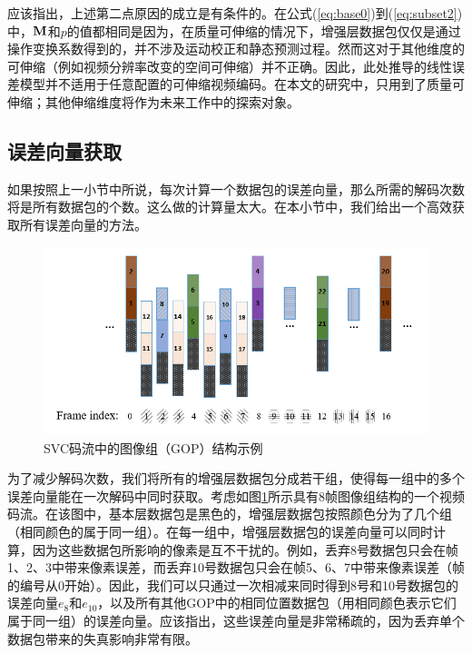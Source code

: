 应该指出，上述第二点原因的成立是有条件的。在公式(\ref{eq:base0})到(\ref{eq:subset2})中，${\rm\bf M}$和$p$的值都相同是因为，在质量可伸缩的情况下，增强层数据包仅仅是通过操作变换系数得到的，并不涉及运动校正和静态预测过程。然而这对于其他维度的可伸缩（例如视频分辨率改变的空间可伸缩）并不正确。因此，此处推导的线性误差模型并不适用于任意配置的可伸缩视频编码。在本文的研究中，只用到了质量可伸缩；其他伸缩维度将作为未来工作中的探索对象。

\subsection{误差向量获取}

如果按照上一小节中所说，每次计算一个数据包的误差向量，那么所需的解码次数将是所有数据包的个数。这么做的计算量太大。在本小节中，我们给出一个高效获取所有误差向量的方法。

\begin{figure}[h]
\centering
\includegraphics[width = 0.9\linewidth]{figures/GOP-Structure.png}
\caption{SVC码流中的图像组（GOP）结构示例 \label{fig:GOP_Structure}}
\end{figure}

为了减少解码次数，我们将所有的增强层数据包分成若干组，使得每一组中的多个误差向量能在一次解码中同时获取。考虑如图\ref{fig:GOP_Structure}所示具有8帧图像组结构的一个视频码流。在该图中，基本层数据包是黑色的，增强层数据包按照颜色分为了几个组（相同颜色的属于同一组）。在每一组中，增强层数据包的误差向量可以同时计算，因为这些数据包所影响的像素是互不干扰的。例如，丢弃8号数据包只会在帧1、2、3中带来像素误差，而丢弃10号数据包只会在帧5、6、7中带来像素误差（帧的编号从0开始）。因此，我们可以只通过一次相减来同时得到8号和10号数据包的误差向量$e_{8}$和$e_{10}$，以及所有其他GOP中的相同位置数据包（用相同颜色表示它们属于同一组）的误差向量。应该指出，这些误差向量是非常稀疏的，因为丢弃单个数据包带来的失真影响非常有限。

